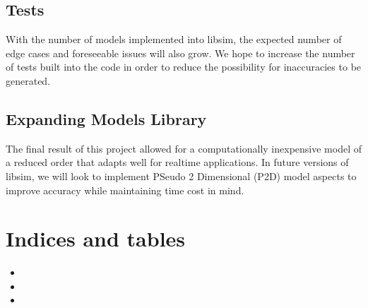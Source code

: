 \documentclass[letterpaper,10pt,english]{sphinxmanual}
\begin{document}
\section{Tests}
\label{\detokenize{future:tests}}
\sphinxAtStartPar
With the number of models implemented into libsim, the expected number
of edge cases and foreseeable issues will also grow. We hope to increase
the number of tests built into the code in order to reduce the possibility
for inaccuracies to be generated.


\section{Expanding Models Library}
\label{\detokenize{future:expanding-models-library}}
\sphinxAtStartPar
The final result of this project allowed for a computationally inexpensive
model of a reduced order that adapts well for real\sphinxhyphen{}time applications. In
future versions of libsim, we will look to implement PSeudo 2 Dimensional
(P2D) model aspects to improve accuracy while maintaining time cost in mind.


\chapter{Indices and tables}
\label{\detokenize{index:indices-and-tables}}\begin{itemize}
\item {} 
\sphinxAtStartPar
{}

\item {} 
\sphinxAtStartPar
{}

\item {} 
\sphinxAtStartPar
{}

\end{itemize}


\renewcommand{\indexname}{Python Module Index}
\begin{sphinxtheindex}
\let\bigletter\sphinxstyleindexlettergroup
\bigletter{d}
\item\relax{}
\indexspace
\bigletter{m}
\item\relax{}
\indexspace
\bigletter{n}
\item\relax{}
\end{sphinxtheindex}

\renewcommand{\indexname}{Index}
\printindex
\end{document}
